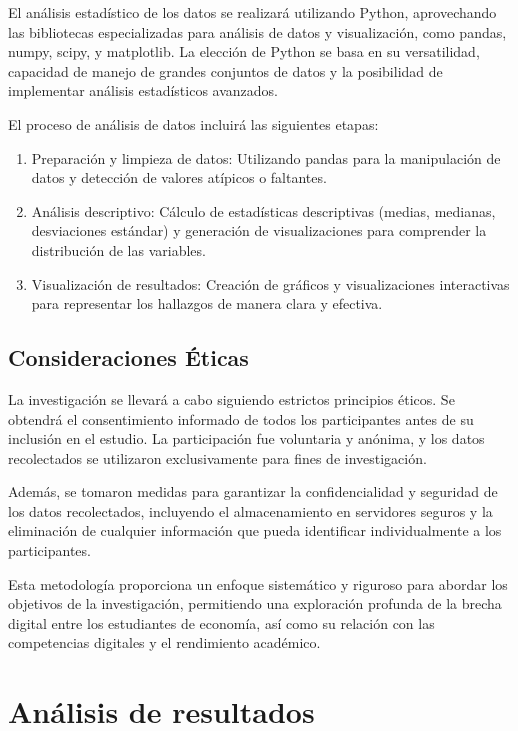 \documentclass[12pt, a4paper]{article}
\begin{document}
El análisis estadístico de los datos se realizará utilizando Python, aprovechando las bibliotecas especializadas para análisis de datos y visualización, como pandas, numpy, scipy, y matplotlib. La elección de Python se basa en su versatilidad, capacidad de manejo de grandes conjuntos de datos y la posibilidad de implementar análisis estadísticos avanzados.

El proceso de análisis de datos incluirá las siguientes etapas:

\begin{enumerate}
    \item Preparación y limpieza de datos: Utilizando pandas para la manipulación de datos y detección de valores atípicos o faltantes.
    \item Análisis descriptivo: Cálculo de estadísticas descriptivas (medias, medianas, desviaciones estándar) y generación de visualizaciones para comprender la distribución de las variables.
    \item Visualización de resultados: Creación de gráficos y visualizaciones interactivas para representar los hallazgos de manera clara y efectiva.
\end{enumerate}

\subsection{Consideraciones Éticas}

La investigación se llevará a cabo siguiendo estrictos principios éticos. Se obtendrá el consentimiento informado de todos los participantes antes de su inclusión en el estudio. La participación fue voluntaria y anónima, y los datos recolectados se utilizaron exclusivamente para fines de investigación. 

Además, se tomaron medidas para garantizar la confidencialidad y seguridad de los datos recolectados, incluyendo el almacenamiento en servidores seguros y la eliminación de cualquier información que pueda identificar individualmente a los participantes.

Esta metodología proporciona un enfoque sistemático y riguroso para abordar los objetivos de la investigación, permitiendo una exploración profunda de la brecha digital entre los estudiantes de economía, así como su relación con las competencias digitales y el rendimiento académico.

\section{Análisis de resultados}
\end{document}
